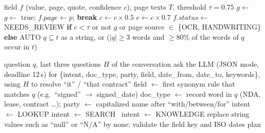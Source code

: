 \begin{algorithm}[H]
\caption{Field grounding and review decision}\label{alg:ground}
\begin{algorithmic}[1]
\Require field $f$ (value, page, quote, confidence $c$), page texts $T$, threshold $\tau = 0.75$
\State $g \gets$ 
 
    $g \gets$ true; $f.\mathit{page} \gets p$; \textbf{break} \EndIf \EndFor
\EndIf
{} $c \gets c \times 0.5$ \EndIf
{} $c \gets c \times 0.7$ \EndIf
\State $f.\mathit{status} \gets$ NEEDS\_REVIEW \textbf{if} $c < \tau$ or not $g$ or page source $\in$ \{OCR, HANDWRITING\} \textbf{else} AUTO
\Statex
{} 
  \State \Return $q \subseteq t$ as a string, or ($|q| \geq 3$ words and $\geq 80\%$ of the words of $q$ occur in $t$)
\EndFunction
\end{algorithmic}
\end{algorithm}

\begin{algorithm}[H]
\caption{Query routing}\label{alg:route}
\begin{algorithmic}[1]
\Require question $q$, last three questions $H$ of the conversation
\State ask the LLM (JSON mode, deadline 12\,s) for \{intent, doc\_type, party, field, date\_from, date\_to, keywords\}, using $H$ to resolve ``it'' / ``that contract''
  \State field $\gets$ first synonym rule that matches $q$ (e.g.\ ``signed'' $\rightarrow$ signed\_date)
  \State doc\_type $\gets$ record word in $q$ (NDA, lease, contract \dots); party $\gets$ capitalized name after ``with/between/for''
   intent $\gets$ LOOKUP
   intent $\gets$ SEARCH
  \Else\ intent $\gets$ KNOWLEDGE \EndIf
\EndIf
\State replace string values such as ``null'' or ``N/A'' by none; validate the field key and ISO dates
\State \Return plan
\end{algorithmic}
\end{algorithm}

